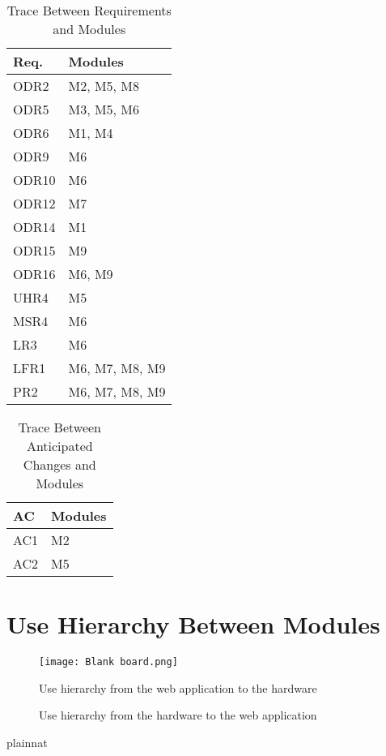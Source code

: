 \documentclass[12pt, titlepage]{article}
\begin{document}
\begin{table}[H]
\centering
\begin{tabular}{p{} p{}}
\toprule
\textbf{Req.} & \textbf{Modules}\\
\midrule
ODR2 & M2, M5, M8\\
ODR5 & M3, M5, M6\\
ODR6 & M1, M4 \\
ODR9 & M6 \\
ODR10 & M6\\
ODR12 & M7\\
ODR14 & M1 \\
ODR15 & M9\\
ODR16 & M6, M9\\
UHR4 & M5\\
MSR4 & M6\\
LR3 & M6\\
LFR1 & M6, M7, M8, M9\\
PR2 & M6, M7, M8, M9\\
\bottomrule
\end{tabular}
\caption{Trace Between Requirements and Modules}
\label{TblRT}
\end{table}

\begin{table}[H]
\centering
\begin{tabular}{p{} p{}}
\toprule
\textbf{AC} & \textbf{Modules}\\
\midrule
AC1 & M2 \\
AC2 & M5 \\
\bottomrule
\end{tabular}
\caption{Trace Between Anticipated Changes and Modules}
\label{TblACT}
\end{table}

\section{Use Hierarchy Between Modules} \label{SecUse}



\begin{figure}[H]
\centering
\texttt{[image: Blank board.png]}
\caption{Use hierarchy from the web application to the hardware}
\caption{Use hierarchy from the hardware to the web application}
\label{FigUH}
\end{figure}


 {plainnat}

\end{document}
